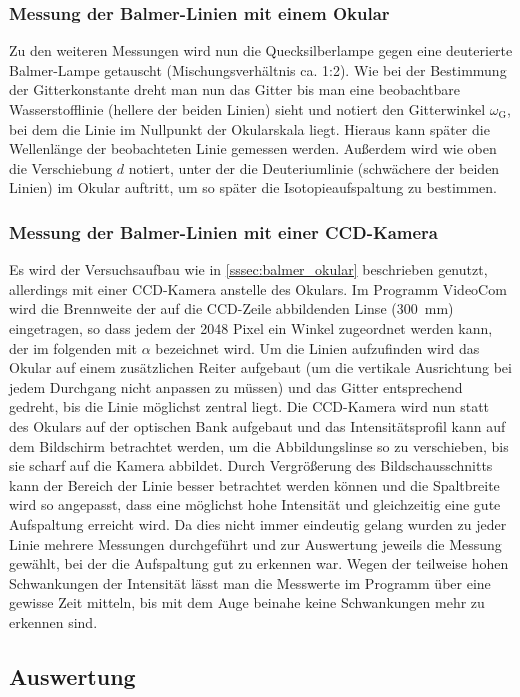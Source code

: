 \documentclass[11pt, a4paper]{article}
\numberwithin{equation}{section}
\begin{document}
\subsubsection{Messung der Balmer-Linien mit einem Okular} 
Zu den weiteren Messungen wird nun die Quecksilberlampe gegen eine deuterierte Balmer-Lampe getauscht (Mischungsverhältnis ca. 1:2).
Wie bei der Bestimmung der Gitterkonstante dreht man nun das Gitter bis man eine beobachtbare Wasserstofflinie (hellere der beiden Linien) sieht und notiert den Gitterwinkel $\omega_\text{G}$, bei dem die Linie im Nullpunkt der Okularskala liegt.
Hieraus kann später die Wellenlänge der beobachteten Linie gemessen werden.
Außerdem wird wie oben die Verschiebung $d$ notiert, unter der die Deuteriumlinie (schwächere der beiden Linien) im Okular auftritt, um so später die Isotopieaufspaltung zu bestimmen.

\subsubsection{Messung der Balmer-Linien mit einer CCD-Kamera}
Es wird der Versuchsaufbau wie in \ref{sssec:balmer_okular} beschrieben genutzt, allerdings mit einer CCD-Kamera anstelle des Okulars. 
Im Programm VideoCom wird die Brennweite der auf die CCD-Zeile abbildenden Linse (\SI{300}{\milli\meter}) eingetragen, so dass jedem der 2048 Pixel ein Winkel zugeordnet werden kann, der im folgenden mit $\alpha$ bezeichnet wird.
Um die Linien aufzufinden wird das Okular auf einem zusätzlichen Reiter aufgebaut (um die vertikale Ausrichtung bei jedem Durchgang nicht anpassen zu müssen) und das Gitter entsprechend gedreht, bis die Linie möglichst zentral liegt.
Die CCD-Kamera wird nun statt des Okulars auf der optischen Bank aufgebaut und das Intensitätsprofil kann auf dem Bildschirm betrachtet werden, um die Abbildungslinse so zu verschieben, bis sie scharf auf die Kamera abbildet.
Durch Vergrößerung des Bildschausschnitts kann der Bereich der Linie besser betrachtet werden können und die Spaltbreite wird so angepasst, dass eine möglichst hohe Intensität und gleichzeitig eine gute Aufspaltung erreicht wird.
Da dies nicht immer eindeutig gelang wurden zu jeder Linie mehrere Messungen durchgeführt und zur Auswertung jeweils die Messung gewählt, bei der die Aufspaltung gut zu erkennen war.
Wegen der teilweise hohen Schwankungen der Intensität lässt man die Messwerte im Programm über eine gewisse Zeit mitteln, bis mit dem Auge beinahe keine Schwankungen mehr zu erkennen sind.

\subsection{Auswertung}
\end{document}
